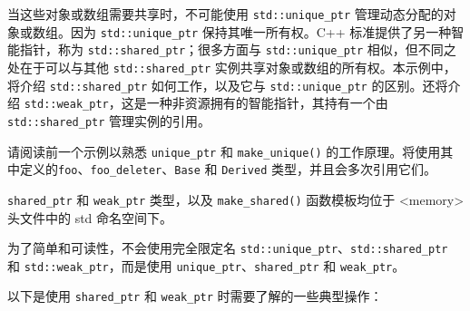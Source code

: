 当这些对象或数组需要共享时，不可能使用 \verb|std::unique_ptr| 管理动态分配的对象或数组。因为 \verb|std::unique_ptr| 保持其唯一所有权。C++ 标准提供了另一种智能指针，称为 \verb|std::shared_ptr|；很多方面与 \verb|std::unique_ptr| 相似，但不同之处在于可以与其他 \verb|std::shared_ptr| 实例共享对象或数组的所有权。本示例中，将介绍 \verb|std::shared_ptr| 如何工作，以及它与 \verb|std::unique_ptr| 的区别。还将介绍 \verb|std::weak_ptr|，这是一种非资源拥有的智能指针，其持有一个由 \verb|std::shared_ptr| 管理实例的引用。


请阅读前一个示例以熟悉 \verb|unique_ptr| 和 \verb|make_unique()| 的工作原理。将使用其中定义的\verb|foo|、\verb|foo_deleter|、\verb|Base| 和 \verb|Derived| 类型，并且会多次引用它们。

\verb|shared_ptr| 和 \verb|weak_ptr| 类型，以及 \verb|make_shared()| 函数模板均位于 <memory> 头文件中的 std 命名空间下。

\begin{myNotic}
为了简单和可读性，不会使用完全限定名 \verb|std::unique_ptr|、\verb|std::shared_ptr| 和 \verb|std::weak_ptr|，而是使用 \verb|unique_ptr|、\verb|shared_ptr| 和 \verb|weak_ptr|。
\end{myNotic}


以下是使用 \verb|shared_ptr| 和 \verb|weak_ptr| 时需要了解的一些典型操作：


